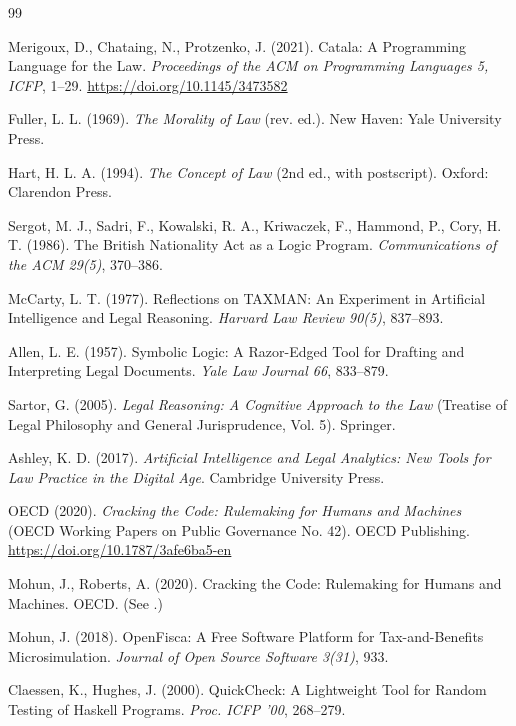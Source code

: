 \documentclass[11pt,letterpaper]{article}
\begin{document}
\begin{thebibliography}{99}

Merigoux, D., Chataing, N., Protzenko, J. (2021). Catala: A Programming Language for the Law. \textit{Proceedings of the ACM on Programming Languages 5, ICFP}, 1--29. \url{https://doi.org/10.1145/3473582}

Fuller, L. L. (1969). \textit{The Morality of Law} (rev. ed.). New Haven: Yale University Press.

Hart, H. L. A. (1994). \textit{The Concept of Law} (2nd ed., with postscript). Oxford: Clarendon Press.

Sergot, M. J., Sadri, F., Kowalski, R. A., Kriwaczek, F., Hammond, P., Cory, H. T. (1986). The British Nationality Act as a Logic Program. \textit{Communications of the ACM 29(5)}, 370--386.

McCarty, L. T. (1977). Reflections on TAXMAN: An Experiment in Artificial Intelligence and Legal Reasoning. \textit{Harvard Law Review 90(5)}, 837--893.

Allen, L. E. (1957). Symbolic Logic: A Razor-Edged Tool for Drafting and Interpreting Legal Documents. \textit{Yale Law Journal 66}, 833--879.

Sartor, G. (2005). \textit{Legal Reasoning: A Cognitive Approach to the Law} (Treatise of Legal Philosophy and General Jurisprudence, Vol. 5). Springer.

Ashley, K. D. (2017). \textit{Artificial Intelligence and Legal Analytics: New Tools for Law Practice in the Digital Age}. Cambridge University Press.

OECD (2020). \textit{Cracking the Code: Rulemaking for Humans and Machines} (OECD Working Papers on Public Governance No. 42). OECD Publishing. \url{https://doi.org/10.1787/3afe6ba5-en}

Mohun, J., Roberts, A. (2020). Cracking the Code: Rulemaking for Humans and Machines. OECD. (See \cite{rac-oecd}.)

Mohun, J. (2018). OpenFisca: A Free Software Platform for Tax-and-Benefits Microsimulation. \textit{Journal of Open Source Software 3(31)}, 933.

Claessen, K., Hughes, J. (2000). QuickCheck: A Lightweight Tool for Random Testing of Haskell Programs. \textit{Proc. ICFP '00}, 268--279.


\end{thebibliography}
\end{document}
